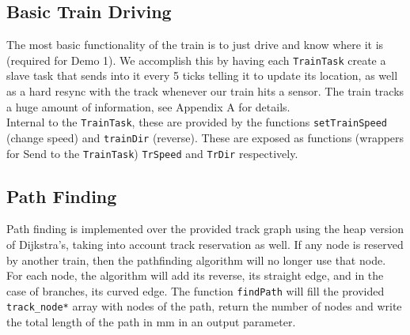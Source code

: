 \documentclass[12pt]{article}
\begin{document}
\subsection{Basic Train Driving}
The most basic functionality of the train is to just drive and know where it is (required for Demo 1). We accomplish
this by having each \texttt{TrainTask} create a slave task that sends into it every 5 ticks telling it to update its
location, as well as a hard resync with the track whenever our train hits a sensor. The train tracks a huge amount of
information, see Appendix A for details.
\\
Internal to the \texttt{TrainTask}, these are provided by the functions \texttt{setTrainSpeed} (change speed) and
\texttt{trainDir} (reverse). These are exposed as functions (wrappers for Send to the \texttt{TrainTask})
\texttt{TrSpeed} and \texttt{TrDir} respectively.

\subsection{Path Finding}
Path finding is implemented over the provided track graph using the heap version of Dijkstra's, taking into account
track reservation as well. If any node is reserved by another train, then the pathfinding algorithm will no longer use
that node. For each node, the algorithm will add its reverse, its straight edge, and in the case of branches, its curved
edge. The function \texttt{findPath} will fill the provided \texttt{track\_node*} array with nodes of the path, return
the number of nodes and write the total length of the path in mm in an output parameter.
\end{document}
